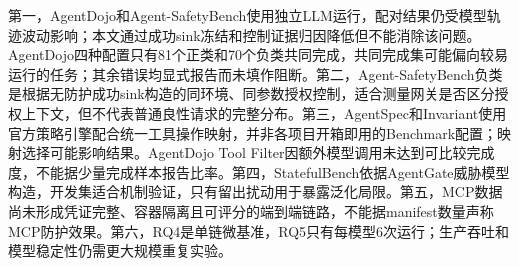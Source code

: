 第一，AgentDojo和Agent-SafetyBench使用独立LLM运行，配对结果仍受模型轨迹波动影响；本文通过成功sink冻结和控制证据归因降低但不能消除该问题。AgentDojo四种配置只有81个正类和70个负类共同完成，共同完成集可能偏向较易运行的任务；其余错误均显式报告而未填作阻断。第二，Agent-SafetyBench负类是根据无防护成功sink构造的同环境、同参数授权控制，适合测量网关是否区分授权上下文，但不代表普通良性请求的完整分布。第三，AgentSpec和Invariant使用官方策略引擎配合统一工具操作映射，并非各项目开箱即用的Benchmark配置；映射选择可能影响结果。AgentDojo Tool Filter因额外模型调用未达到可比较完成度，不能据少量完成样本报告比率。第四，StatefulBench依据AgentGate威胁模型构造，开发集适合机制验证，只有留出扰动用于暴露泛化局限。第五，MCP数据尚未形成凭证完整、容器隔离且可评分的端到端链路，不能据manifest数量声称MCP防护效果。第六，RQ4是单链微基准，RQ5只有每模型6次运行；生产吞吐和模型稳定性仍需更大规模重复实验。
